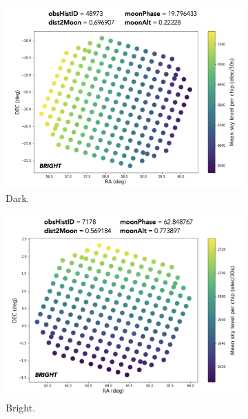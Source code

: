 \begin{figure}
\centering
\label{fig:skymodel3}
\begin{subfigure}[b]{.3\textwidth}
  \centering
  \includegraphics[width=\textwidth]{images/sensors/skymodel_dark.jpg}
  \caption{Dark.}
  \label{fig:sub1}
\end{subfigure}%
\begin{subfigure}[b]{.3\textwidth}
  \centering
  \includegraphics[width=\textwidth]{images/sensors/skymodel_bright1.jpg}
  \caption{Bright.}
  \label{fig:sub2}
\end{subfigure}
\begin{subfigure}[b]{.3\textwidth}
  \centering

\end{subfigure}
\end{figure}
